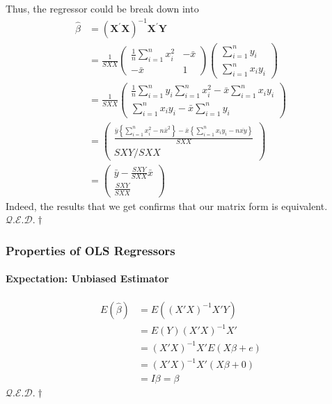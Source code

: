 \documentclass[11pt]{article}
\newcommand{\qed}{\hfill $\mathcal{Q}.\mathcal{E}.\mathcal{D}.\dagger$}
\begin{document}
Thus, the regressor could be break down into
\begin{align*}
	\hat{\beta} 
	&=\left(\mathbf{X}^{\prime} \mathbf{X}\right)^{-1} \mathbf{X}^{\prime} \mathbf{Y} \\
	&=\frac{1}{S X X}\left(\begin{array}{cc}{\frac{1}{n} \sum_{i=1}^{n} x_{i}^{2}} & {-\bar{x}} \\ {-\bar{x}} & {1}\end{array}\right)\left(\begin{array}{c}{\sum_{i=1}^{n} y_{i}} \\ {\sum_{i=1}^{n} x_{i} y_{i}}\end{array}\right) \\
	&= \frac{1}{S X X}\left(\begin{array}{c}{\frac{1}{n} \sum_{i=1}^{n} y_{i} \sum_{i=1}^{n} x_{i}^{2}-\bar{x} \sum_{i=1}^{n} x_{i} y_{i}} \\ {\sum_{i=1}^{n} x_{i} y_{i}-\bar{x} \sum_{i=1}^{n} y_{i}}\end{array}\right) \\
	&= \begin{pmatrix}
		\frac{\bar{y}\left\{\sum_{i=1}^{n} x_{i}^{2}-n \bar{x}^{2}\right\}-\bar{x}\left\{\sum_{i=1}^{n} x_{i} y_{i}-n \overline{x y}\right\}}{S X X} \\
		{S X Y}/{S X X}
	\end{pmatrix} \\
	&= \left(\begin{array}{l}{\bar{y}-\frac{S X Y}{S X X} \bar{x}} \\ {\frac{S X Y}{S X X}}\end{array}\right)
\end{align*}
Indeed, the results that we get confirms that our matrix form is equivalent. \qed 


\subsubsection{Properties of OLS Regressors}
\paragraph{Expectation: Unbiased Estimator}
\begin{align*}
    E(\hat{\beta}) &= E((X'X)^{-1}X'Y) \\
    &= E(Y)(X'X)^{-1}X' \\
    &= (X'X)^{-1}X' E(X\beta + e) \\
    &= (X'X)^{-1}X' (X\beta + 0) \\
    &= I\beta = \beta
\end{align*}
\qed
\end{document}
